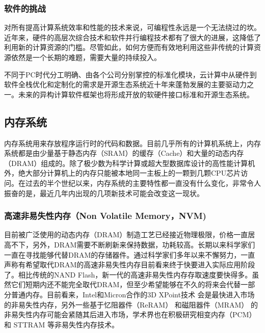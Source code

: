 \subsubsection{软件的挑战}

对所有提高计算系统效率和性能的技术来说，可编程性永远是一个无法绕过的坎。近年来，硬件的高层次综合技术和软件并行编程技术都有了很大的进展，这降低了利用新的计算资源的门槛。尽管如此，如何方便而有效地利用这些非传统的计算资源依然是一个长期的难题，需要大量的持续投入。

不同于PC时代分工明确、由各个公司分别掌控的标准化模块，云计算中从硬件到软件全栈优化和定制化的需求是开源生态系统近十年来蓬勃发展的主要驱动力之一。未来的异构计算软件框架也将形成开放的软硬件接口标准和开源生态系统。

\subsection{内存系统}

内存系统用来存放程序运行时的代码和数据。目前几乎所有的计算机系统上，内存系统都是由少量基于静态内存（SRAM）的缓存（Cache）和大量的动态内存（DRAM）组成的。除了极少数为科学计算或超大型数据库设计的高性能计算机外，绝大部分计算机上的内存只能被本地同一主板上的一颗到几颗CPU芯片访问。在过去的半个世纪以来，内存系统的主要特性都一直没有什么变化，非常令人振奋的是，最近几年内出现的几项新技术可能会改变这一现状。

\subsubsection{高速非易失性内存（Non Volatile Memory，NVM)}

目前被广泛使用的动态内存（DRAM）制造工艺已经接近物理极限，价格一直居高不下，另外，DRAM需要不断刷新来保持数据，功耗较高。长期以来科学家们一直在寻找能够代替DRAM的存储器件。通过科学家们多年以来不懈努力，一直声称有希望取代DRAM的高速非易失性内存目前看来终于快要进入实际应用阶段了。相比传统的NAND Flash，新一代的高速非易失性内存存取速度要快得多。虽然它们短期内还不能完全取代DRAM，但至少希望能够在不久的将来会代替一部分普通内存。目前看来，Intel和Micron合作的3D XPoint技术 \cite{3d-xpoint} 会是最快进入市场的非易失性内存，另外一些基于忆阻器件（ReRAM） \cite{akinaga2010resistive} 和磁阻器件（MRAM） \cite{tehrani1999progress} 的非易失性内存可能会紧随其后进入市场，学术界也在积极研究相变内存（PCM） \cite{raoux2008phase,lee2010phase} 和 STTRAM \cite{kultursay2013evaluating,apalkov2013spin} 等非易失性内存技术。

